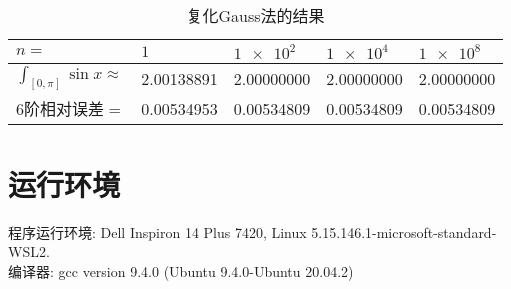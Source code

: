 \documentclass[a4paper]{ctexart}
\theoremstyle{plain}
\theoremstyle{remark}
\numberwithin{equation}{section}
\begin{document}
\begin{table}[H]
    \centering
    \begin{tabular}{|l|l|l|l|l|}
    \hline
    $n=$ & $1$ & $\num{1e2}$ & $\num{1e4}$ & $\num{1e8}$ \\ \hline
    $\int_{[0,\pi]}\sin{x}\approx$ & 2.00138891 & 2.00000000 & 2.00000000 & 2.00000000 \\ \hline
    $6$阶相对误差$=$ & 0.00534953 & 0.00534809 & 0.00534809 & 0.00534809 \\ \hline
    \end{tabular}
    \caption{复化Gauss法的结果}
\end{table}

\section{运行环境}
\noindent 程序运行环境: Dell Inspiron 14 Plus 7420, Linux 5.15.146.1-microsoft-standard-WSL2.\\
编译器: gcc version 9.4.0 (Ubuntu 9.4.0-Ubuntu 20.04.2)

\appendix
\end{document}
